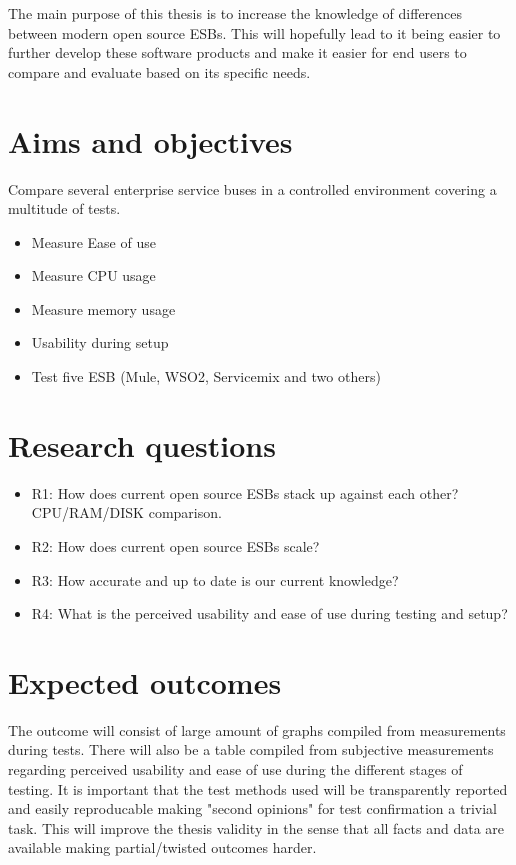 \documentclass[10pt,a4paper]{proposal}
\begin{document}
The main purpose of this thesis is to increase the knowledge of differences between modern open source ESBs. 
This will hopefully lead to it being easier to further develop these software products and make it easier for end users to compare and evaluate based on its specific needs.


\section*{Aims and objectives}
Compare several enterprise service buses in a controlled environment covering a multitude of tests.

\begin{itemize}
	\item Measure Ease of use
	\item Measure CPU usage
	\item Measure memory usage
	\item Usability during setup
	\item  Test five ESB (Mule, WSO2, Servicemix and two others)
\end{itemize}


\section*{Research questions}
\begin{itemize}
	\item R1: How does current open source ESBs stack up against each other? CPU/RAM/DISK comparison.
	\item R2: How does current open source ESBs scale?
	\item R3: How accurate and up to date is our current knowledge? 
	\item R4: What is the perceived usability and ease of use during testing and setup?
\end{itemize}


\section*{Expected outcomes}
The outcome will consist of large amount of graphs compiled from measurements during tests.
There will also be a table compiled from subjective measurements regarding perceived usability and ease of use during the different stages of testing.
It is important that the test methods used will be transparently reported and easily reproducable making "second opinions" for test confirmation a trivial task. 
This will improve the thesis validity in the sense that all facts and data are available making partial/twisted outcomes harder.
\end{document}
